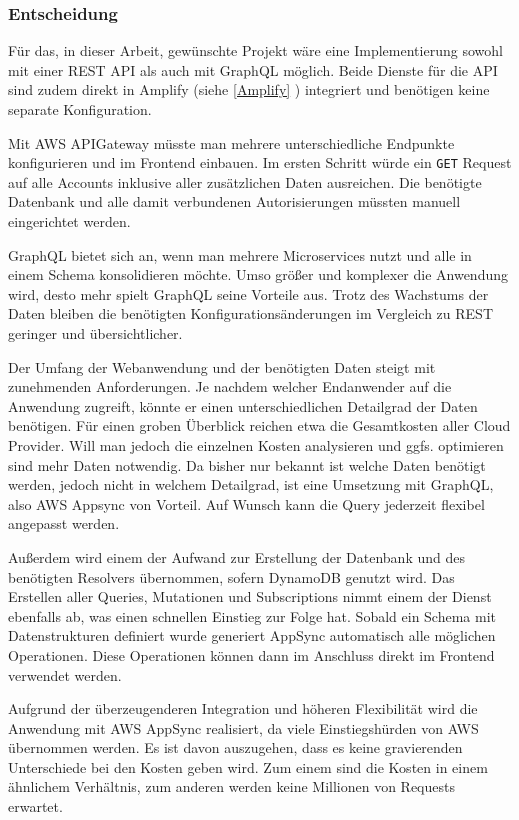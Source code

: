 \subsubsection{Entscheidung}
Für das, in dieser Arbeit, gewünschte Projekt wäre eine Implementierung sowohl mit einer REST API als auch mit GraphQL möglich.
Beide Dienste für die API sind zudem direkt in Amplify (siehe \ref{Amplify} ) integriert und benötigen keine separate Konfiguration.

Mit AWS APIGateway müsste man mehrere unterschiedliche Endpunkte konfigurieren und im Frontend einbauen.
Im ersten Schritt würde ein \verb+GET+ Request auf alle Accounts inklusive aller zusätzlichen Daten ausreichen.
Die benötigte Datenbank und alle damit verbundenen Autorisierungen müssten manuell eingerichtet werden.

GraphQL bietet sich an, wenn man mehrere Microservices nutzt und alle in einem Schema konsolidieren möchte.
Umso größer und komplexer die Anwendung wird, desto mehr spielt GraphQL seine Vorteile aus.
Trotz des Wachstums der Daten bleiben die benötigten Konfigurationsänderungen im Vergleich zu REST geringer und übersichtlicher.

Der Umfang der Webanwendung und der benötigten Daten steigt mit zunehmenden Anforderungen.
Je nachdem welcher Endanwender auf die Anwendung zugreift, könnte er einen unterschiedlichen Detailgrad der Daten benötigen.
Für einen groben Überblick reichen etwa die Gesamtkosten aller Cloud Provider.
Will man jedoch die einzelnen Kosten analysieren und ggfs. optimieren sind mehr Daten notwendig.
Da bisher nur bekannt ist welche Daten benötigt werden, jedoch nicht in welchem Detailgrad, ist eine Umsetzung mit GraphQL, also AWS Appsync von Vorteil.
Auf Wunsch kann die Query jederzeit flexibel angepasst werden.

Außerdem wird einem der Aufwand zur Erstellung der Datenbank und des benötigten Resolvers übernommen, sofern DynamoDB genutzt wird.
Das Erstellen aller Queries, Mutationen und Subscriptions nimmt einem der Dienst ebenfalls ab, was einen schnellen Einstieg zur Folge hat.
Sobald ein Schema mit Datenstrukturen definiert wurde generiert AppSync automatisch alle möglichen Operationen.
Diese Operationen können dann im Anschluss direkt im Frontend verwendet werden.

Aufgrund der überzeugenderen Integration und höheren Flexibilität wird die Anwendung mit AWS AppSync realisiert, da viele Einstiegshürden von AWS übernommen werden.
Es ist davon auszugehen, dass es keine gravierenden Unterschiede bei den Kosten geben wird.
Zum einem sind die Kosten in einem ähnlichem Verhältnis, zum anderen werden keine Millionen von Requests erwartet.





